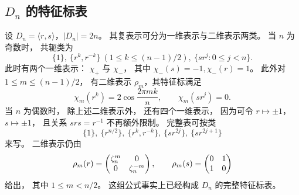 \subsection*{$D_n$ 的特征标表}
设 $D_n=\langle r,s\rangle$，$|D_n|=2n$。 其复表示可分为一维表示与二维表示两类。 当 $n$ 为奇数时， 共轭类为
\[
\{1\},\ \{r^k,r^{-k}\}\ (1\le k\le (n-1)/2),\ \{sr^j:0\le j<n\}.
\]
此时有两个一维表示： $\chi_+$ 与 $\chi_-$， 其中 $\chi_-(s)=-1,\chi_-(r)=1$。 此外对 $1\le m\le (n-1)/2$， 有二维表示 $\rho_m$，其特征标满足
\[
\chi_m(r^k)=2\cos\frac{2\pi mk}{n},
\qquad
\chi_m(sr^j)=0.
\]
当 $n$ 为偶数时， 除上述二维表示外， 还有四个一维表示， 因为可令 $r\mapsto \pm 1$，$s\mapsto \pm 1$， 且关系 $srs=r^{-1}$ 不再额外限制。 完整表可按类
\[
\{1\},\ \{r^{n/2}\},\ \{r^k,r^{-k}\},\ \{sr^{2j}\},\ \{sr^{2j+1}\}
\]
来写。 二维表示仍由
\[
\rho_m(r)=
\begin{pmatrix} \zeta_n^m&0\\0&\zeta_n^{-m} \end{pmatrix},
\qquad
\rho_m(s)=\begin{pmatrix} 0&1\\1&0 \end{pmatrix}
\]
给出， 其中 $1\le m< n/2$。 这组公式事实上已经构成 $D_n$ 的完整特征标表。
